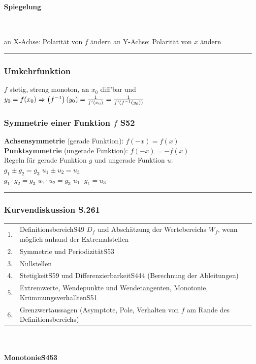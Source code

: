 \paragraph{Spiegelung}\
\label{par:Funktionen}

an X-Achse:  Polarität von $f$ ändern \qquad \qquad an Y-Achse:  Polarität von $x$ ändern
\hrule
\begin{multicols}{2}\subsubsection{Umkehrfunktion}
\label{subsub: Funktionen}
$f$ stetig, streng monoton, an $x_0$ diff'bar und $y_0=f(x_0) \\
\Rightarrow \left(f^{-1}\right)(y_0)= \frac{1}{f'(x_0)} =\frac{1}{f'(f^{-1}\left(y_0\right))}$
\subsubsection{Symmetrie einer Funktion $f$ \color{red} S52}
\textbf{Achsensymmetrie} (gerade Funktion): $f(-x)=f(x)$\\
\textbf{Punktsymmetrie} (ungerade Funktion): $f(-x)=-f(x)$\\
Regeln für gerade Funktion $g$ und ungerade Funktion $u$:\\
$g_1 \pm g_2 = g_3$ \qquad $u_1 \pm u_2 = u_3$\\
$g_1 \cdot g_2=g_3$ \qquad $u_1 \cdot u_2 = g_3$ \qquad $u_1 \cdot g_1=u_3$

\end{multicols}
\hrule

\subsubsection{Kurvendiskussion \color{red}S.261}

\begin{tabular}{p{1mm}p{12cm}}
	1.&	Definitionsbereich{\color{red}S49} $D_{f}$ und Abschätzung der Wertebereichs $W_{f}$, wenn möglich anhand der Extremalstellen\\
	2.& Symmetrie und Periodizität{\color{red}S53}\\
	3.& Nullstellen\\
	4.& Stetigkeit{\color{red}S59} und Differenzierbarkeit{\color{red}S444} (Berechnung der Ableitungen)\\
	5.& Extremwerte, Wendepunkte und Wendetangenten, Monotonie, Krümmungsverhallten{\color{red}S51}\\
	6.& Grenzwertaussagen (Asymptote, Pole, Verhalten von $f$ am Rande des Definitionsbereichs)\\
\end{tabular}
\\
\\
\textbf{Monotonie{\color{red}S453}}


